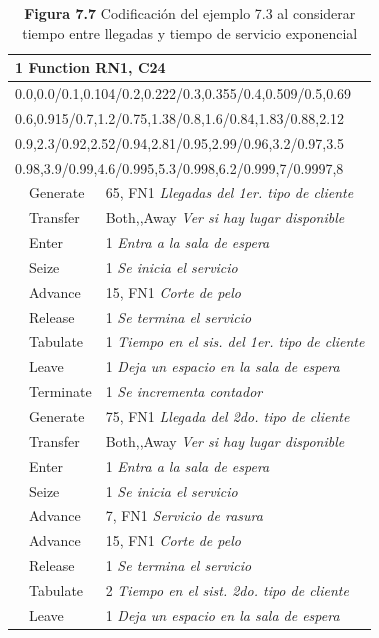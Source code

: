 \documentclass[11pt,letterpaper]{report}
\begin{document}
\begin{table}[H]
\centering
\caption*{\textbf{Figura 7.7} Codificación del ejemplo 7.3 al considerar tiempo entre llegadas y tiempo de servicio exponencial}
\begin{tabular}{lll}
\toprule
\multicolumn{3}{l}{1 \quad Function \quad RN1, C24} \\
\midrule
\multicolumn{3}{l}{0.0,0.0/0.1,0.104/0.2,0.222/0.3,0.355/0.4,0.509/0.5,0.69} \\
\multicolumn{3}{l}{0.6,0.915/0.7,1.2/0.75,1.38/0.8,1.6/0.84,1.83/0.88,2.12} \\
\multicolumn{3}{l}{0.9,2.3/0.92,2.52/0.94,2.81/0.95,2.99/0.96,3.2/0.97,3.5} \\
\multicolumn{3}{l}{0.98,3.9/0.99,4.6/0.995,5.3/0.998,6.2/0.999,7/0.9997,8} \\
\midrule
 & Generate & 65, FN1 \quad \textit{Llegadas del 1er. tipo de cliente} \\
 & Transfer & Both,,Away \quad \textit{Ver si hay lugar disponible} \\
 & Enter & 1 \quad \textit{Entra a la sala de espera} \\
 & Seize & 1 \quad \textit{Se inicia el servicio} \\
 & Advance & 15, FN1 \quad \textit{Corte de pelo} \\
 & Release & 1 \quad \textit{Se termina el servicio} \\
 & Tabulate & 1 \quad \textit{Tiempo en el sis. del 1er. tipo de cliente} \\
 & Leave & 1 \quad \textit{Deja un espacio en la sala de espera} \\
 & Terminate & 1 \quad \textit{Se incrementa contador} \\
 & Generate & 75, FN1 \quad \textit{Llegada del 2do. tipo de cliente} \\
 & Transfer & Both,,Away \quad \textit{Ver si hay lugar disponible} \\
 & Enter & 1 \quad \textit{Entra a la sala de espera} \\
 & Seize & 1 \quad \textit{Se inicia el servicio} \\
 & Advance & 7, FN1 \quad \textit{Servicio de rasura} \\
 & Advance & 15, FN1 \quad \textit{Corte de pelo} \\
 & Release & 1 \quad \textit{Se termina el servicio} \\
 & Tabulate & 2 \quad \textit{Tiempo en el sist. 2do. tipo de cliente} \\
 & Leave & 1 \quad \textit{Deja un espacio en la sala de espera} \\

\end{tabular}
\end{table}
\end{document}
